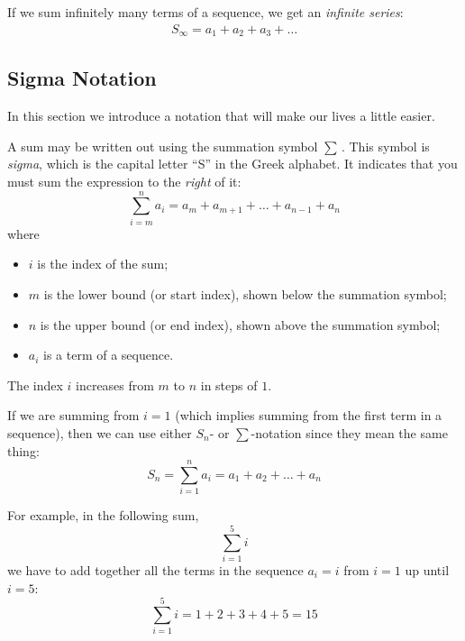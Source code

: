 If we sum infinitely many terms of a sequence, we get an \textit{infinite series}:
\begin{eqnarray}
S_\infty = a_1 + a_2 + a_3 + \ldots
\end{eqnarray}

\subsection{Sigma Notation}

In this section we introduce a notation that will make our lives a little easier.

A sum may be written out using the summation symbol $\sum$\,. This symbol is \textit{sigma}, which is the capital letter ``S'' in the Greek alphabet. It indicates that you must sum the expression to the \textit{right} of it:
\begin{equation}
\label{eq:mp:se:sigma}
\sum_{i=m}^n a_i = a_m + a_{m+1} + \ldots + a_{n-1}+ a_n
\end{equation}
where
\begin{itemize}
\item $i$ is the index of the sum;
\item $m$ is the lower bound (or start index), shown below the summation symbol;
\item $n$ is the upper bound (or end index), shown above the summation symbol;
\item $a_i$ is a term of a sequence.
\end{itemize}

The index $i$ increases from $m$ to $n$ in steps of $1$.

If we are summing from $i=1$ (which implies summing from the first term in a sequence), then we can use either $S_n$- or $\sum$-notation since they mean the same thing:
\begin{equation}
\label{eq:mp:se:Ssigma}
S_n=\sum_{i=1}^n a_i = a_1 + a_2 + \ldots + a_n
\end{equation}

For example, in the following sum,
\begin{equation*}
\sum_{i=1}^5 i
\end{equation*}
we have to add together all the terms in the sequence $a_i=i$ from $i=1$ up until $i=5$:
\begin{equation*}
\sum_{i=1}^5 i = 1 + 2 + 3 + 4 + 5 = 15
\end{equation*}

